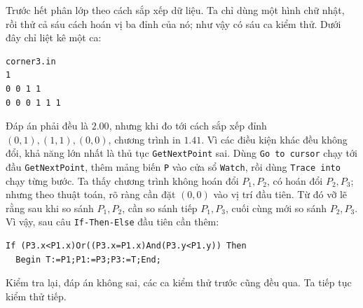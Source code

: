 \documentclass[11pt]{article}
\begin{document}
Trước hết phân lớp theo cách sắp xếp dữ liệu. Ta chỉ dùng một hình chữ nhật,
rồi thử cả sáu cách hoán vị ba đỉnh của nó; như vậy có sáu ca kiểm thử. Dưới
đây chỉ liệt kê một ca:
\begin{verbatim}
corner3.in
1
0 0 1 1
0 0 0 1 1 1
\end{verbatim}
Đáp án phải đều là \(2.00\), nhưng khi đo tới cách sắp xếp đỉnh
\((0,1),(1,1),(0,0)\), chương trình in \(1.41\). Vì các điều kiện khác đều
không đổi, khả năng lớn nhất là thủ tục \texttt{GetNextPoint} sai. Dùng
\texttt{Go to cursor} chạy tới đầu \texttt{GetNextPoint}, thêm mảng biến
\texttt{P} vào cửa sổ \texttt{Watch}, rồi dùng \texttt{Trace into} chạy từng
bước. Ta thấy chương trình không hoán đổi \(P_1,P_2\), có hoán đổi \(P_2,P_3\);
nhưng theo thuật toán, rõ ràng cần đặt \((0,0)\) vào vị trí đầu tiên. Từ đó
vỡ lẽ rằng sau khi so sánh \(P_1,P_2\), cần so sánh tiếp \(P_1,P_3\), cuối
cùng mới so sánh \(P_2,P_3\). Vì vậy, sau câu \texttt{If-Then-Else} đầu tiên
cần thêm:
\begin{verbatim}
If (P3.x<P1.x)Or((P3.x=P1.x)And(P3.y<P1.y)) Then
  Begin T:=P1;P1:=P3;P3:=T;End;
\end{verbatim}
Kiểm tra lại, đáp án không sai, các ca kiểm thử trước cũng đều qua. Ta tiếp
tục kiểm thử tiếp.
\end{document}
